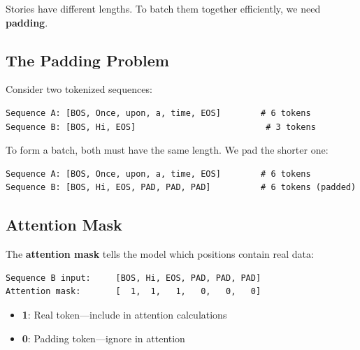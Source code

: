 Stories have different lengths. To batch them together efficiently, we need \textbf{padding}.

\subsection{The Padding Problem}

Consider two tokenized sequences:
\begin{lstlisting}[style=shell, numbers=none]
Sequence A: [BOS, Once, upon, a, time, EOS]        # 6 tokens
Sequence B: [BOS, Hi, EOS]                          # 3 tokens
\end{lstlisting}

To form a batch, both must have the same length. We pad the shorter one:
\begin{lstlisting}[style=shell, numbers=none]
Sequence A: [BOS, Once, upon, a, time, EOS]        # 6 tokens
Sequence B: [BOS, Hi, EOS, PAD, PAD, PAD]          # 6 tokens (padded)
\end{lstlisting}

\subsection{Attention Mask}

The \textbf{attention mask} tells the model which positions contain real data:

\begin{lstlisting}[style=shell, numbers=none]
Sequence B input:     [BOS, Hi, EOS, PAD, PAD, PAD]
Attention mask:       [  1,  1,   1,   0,   0,   0]
\end{lstlisting}

\begin{itemize}
    \item \textbf{1}: Real token---include in attention calculations
    \item \textbf{0}: Padding token---ignore in attention
\end{itemize}

